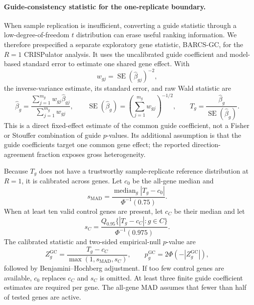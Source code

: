 \paragraph{Guide-consistency statistic for the one-replicate boundary.}
When sample replication is insufficient, converting a guide statistic through
a low-degree-of-freedom $t$ distribution can erase useful ranking information.
We therefore prespecified a separate exploratory gene statistic, BARCS-GC,
for the $R=1$ CRISPulator analysis.  It uses the uncalibrated guide
coefficient and model-based standard error to estimate one shared gene effect.
With
\begin{equation}
  w_{gj}
  =
  \operatorname{SE}(\widehat{\beta}_{gj})^{-2},
\end{equation}
the inverse-variance estimate, its standard error, and raw Wald statistic are
\begin{equation}
  \widehat{\beta}_g
  =
  \frac{\sum_{j=1}^{m_g}w_{gj}\widehat{\beta}_{gj}}
       {\sum_{j=1}^{m_g}w_{gj}},
  \qquad
  \operatorname{SE}(\widehat{\beta}_g)
  =
  \left(\sum_{j=1}^{m_g}w_{gj}\right)^{-1/2},
  \qquad
  T_g
  =
  \frac{\widehat{\beta}_g}
       {\operatorname{SE}(\widehat{\beta}_g)}.
  \label{eq:guideconsistency}
\end{equation}
This is a direct fixed-effect estimate of the common guide coefficient, not a
Fisher or Stouffer combination of guide $p$-values.  Its additional assumption
is that the guide coefficients target one common gene effect; the reported
direction-agreement fraction exposes gross heterogeneity.

Because $T_g$ does not have a trustworthy sample-replicate reference
distribution at $R=1$, it is calibrated across genes.  Let $c_0$ be the
all-gene median and
\begin{equation}
  s_{\mathrm{MAD}}
  =
  \frac{\operatorname{median}_g|T_g-c_0|}
       {\Phi^{-1}(0.75)}.
  \label{eq:gcmad}
\end{equation}
When at least ten valid control genes are present, let $c_C$ be their median
and let
\begin{equation}
  s_C
  =
  \frac{Q_{0.95}\{|T_g-c_C|:g\in C\}}
       {\Phi^{-1}(0.975)}.
  \label{eq:gccontrol}
\end{equation}
The calibrated statistic and two-sided empirical-null $p$-value are
\begin{equation}
  Z_g^{\mathrm{GC}}
  =
  \frac{T_g-c_C}{\max(1,s_{\mathrm{MAD}},s_C)},
  \qquad
  p_g^{\mathrm{GC}}
  =
  2\Phi(-|Z_g^{\mathrm{GC}}|),
  \label{eq:gcz}
\end{equation}
followed by Benjamini--Hochberg adjustment.  If too few control genes are
available, $c_0$ replaces $c_C$ and $s_C$ is omitted.  At least three finite
guide coefficient estimates are required per gene.  The all-gene MAD assumes
that fewer than half of tested genes are active.


